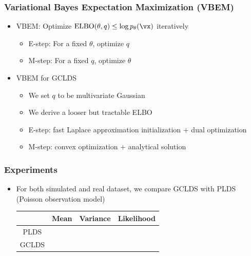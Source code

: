 \documentclass[16pt,presentation]{beamer}
\newcommand{\cmark}{\ding{51}}%
\newcommand{\xmark}{\ding{55}}%
\begin{document}
\begin{frame}
\frametitle{Variational Bayes Expectation Maximization (VBEM)}
\begin{itemize}
\item VBEM: Optimize $\text{ELBO}(\theta, q) \leq \log p_\theta(\vx)$ iteratively %
\begin{itemize}
\item E-step: For a fixed $\theta$, optimize $q$ %
\item M-step: For a fixed $q$, optimize $\theta$
\end{itemize}
\item VBEM for GCLDS 
\begin{itemize}
\item We set $q$ to be multivariate Gaussian
\item We derive a looser but tractable ELBO%
\item E-step: fast Laplace approximation initialization + dual optimization
\item M-step: convex optimization + analytical solution
\end{itemize}
\end{itemize}
\end{frame}


\begin{frame}
\frametitle{Experiments}
\begin{itemize}
\item For both simulated and real dataset, we compare GCLDS with PLDS (Poisson observation model)
\begin{center}
\begin{tabular}{ cccc } 
 \hline
  & Mean & Variance & \alert{Likelihood} \\
 \hline
 PLDS & \cmark & \xmark& \xmark \\ 
 \alert{GCLDS} &\cmark &\cmark &\cmark \\ 
 \hline
\end{tabular}
\end{center}
\end{itemize}
\end{frame}
\end{document}
